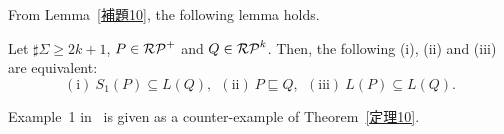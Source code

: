 From Lemma~\ref{補題10}, the following lemma holds.
\begin{thm}\label{定理10}
    Let $\sharp\Sigma \geq 2k+1$, $P \in \mathcal{RP}^{+}$ and $Q \in \mathcal{RP}^{k}$.
    Then, the following (i), (ii) and (iii) are equivalent:
    \[
        (\mathrm{i})\ S_{1}(P) \subseteq L(Q),\ \
        (\mathrm{ii})\ P \sqsubseteq Q,\ \
        (\mathrm{iii})\ L(P) \subseteq L(Q).
    \]
\end{thm}
%

Example~1 in~\cite{Sato1} is given as a counter-example of Theorem~\ref{定理10}.


